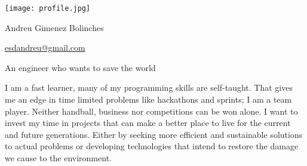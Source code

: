 \documentclass[]{infinity-cv}
\begin{document}
\hypersetup{
    hidelinks,%
    pdfnewwindow%
} %
\begin{minipage}{0.15\textwidth} %
    \texttt{[image: profile.jpg]}
\end{minipage}
\hfill
\begin{minipage}{0.6\textwidth}
    \centering
    {\Huge\color{heading}Andreu Gimenez Bolinches}
    
    \medskip
    
    \hfill
    \href{mailto:esdandreu@gmail.com}{
        \faEnvelope\hspace{1pt} esdandreu@gmail.com
    } \hfill
    \href{https://www.linkedin.com/in/andreu-gimenez-bolinches-esdandreu/}{
        \faLinkedin
    } \hfill
    \href{https://esdandreu.herokuapp.com}{\faGlobe} \hfill
    \href{https://stackoverflow.com/users/13180090/andreu-gimenez}{
        \faStackOverflow
    } \hfill
    \href{https://github.com/esdandreu}{\faGithub} \hfill
    \href{https://gitlab.com/esdandreu}{\faGitlab} \hfill
    
    \medskip
    An engineer who wants to save the world
\end{minipage}
\hfill
\begin{minipage}{0.15\textwidth}
\end{minipage}
\medskip


\medskip
I am a fast learner, many of my programming skills are self-taught. That gives
me an edge in time limited problems like hackathons and sprints; I am a team
player. Neither handball, business nor competitions can be won alone. I want to
invest my time in projects that can make a better place to live for the current
and future generations. Either by seeking more efficient and sustainable
solutions to actual problems or developing technologies that intend to restore
the damage we cause to the environment.

\section{\faWrench}

\begin{minipage}{0.45\textwidth}
    
\end{minipage}
\hfill
\begin{minipage}{0.5\textwidth}
    
\end{minipage}

\section{\faGamepad}
\end{document}
